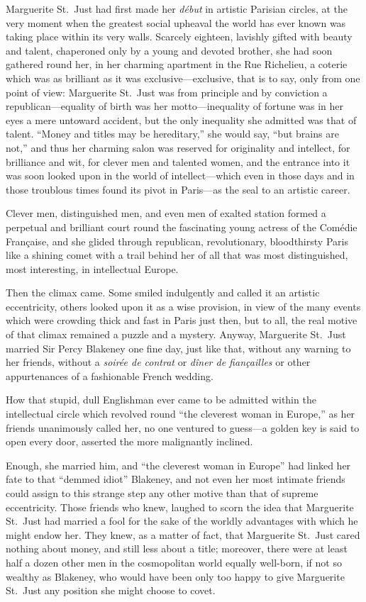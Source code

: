 \documentclass[paper=a5,BCOR=7mm,twoside,DIV=calc,12pt,usegeometry,chapterprefix,endperiod,headings=big]{scrbook}
\begin{document}
Marguerite St.~Just had first made her \textit{début} in artistic Parisian circles, at the very moment when the greatest social upheaval the world has ever known was taking place within its very walls. Scarcely eighteen, lavishly gifted with beauty and talent, chaperoned only by a young and devoted brother, she had soon gathered round her, in her charming apartment in the Rue Richelieu, a coterie which was as brilliant as it was exclusive---exclusive, that is to say, only from one point of view: Marguerite St.~Just was from principle and by conviction a republican---equality of birth was her motto---inequality of fortune was in her eyes a mere untoward accident, but the only inequality she admitted was that of talent. \enquote{Money and titles may be hereditary,} she would say, \enquote{but brains are not,} and thus her charming salon was reserved for originality and intellect, for brilliance and wit, for clever men and talented women, and the entrance into it was soon looked upon in the world of intellect---which even in those days and in those troublous times found its pivot in Paris---as the seal to an artistic career.

Clever men, distinguished men, and even men of exalted station formed a perpetual and brilliant court round the fascinating young actress of the Comédie Française, and she glided through republican, revolutionary, bloodthirsty Paris like a shining comet with a trail behind her of all that was most distinguished, most interesting, in intellectual Europe.

Then the climax came. Some smiled indulgently and called it an artistic eccentricity, others looked upon it as a wise provision, in view of the many events which were crowding thick and fast in Paris just then, but to all, the real motive of that climax remained a puzzle and a mystery. Anyway, Marguerite St.~Just married Sir Percy Blakeney one fine day, just like that, without any warning to her friends, without a \textit{soirée de contrat} or \textit{dîner de fiançailles} or other appurtenances of a fashionable French wedding.

How that stupid, dull Englishman ever came to be admitted within the intellectual circle which revolved round \enquote{the cleverest woman in Europe,} as her friends unanimously called her, no one ventured to guess---a golden key is said to open every door, asserted the more malignantly inclined.

Enough, she married him, and \enquote{the cleverest woman in Europe} had linked her fate to that \enquote{demmed idiot} Blakeney, and not even her most intimate friends could assign to this strange step any other motive than that of supreme eccentricity. Those friends who knew, laughed to scorn the idea that Marguerite St.~Just had married a fool for the sake of the worldly advantages with which he might endow her. They knew, as a matter of fact, that Marguerite St.~Just cared nothing about money, and still less about a title; moreover, there were at least half a dozen other men in the cosmopolitan world equally well-born, if not so wealthy as Blakeney, who would have been only too happy to give Marguerite St.~Just any position she might choose to covet.
\end{document}

